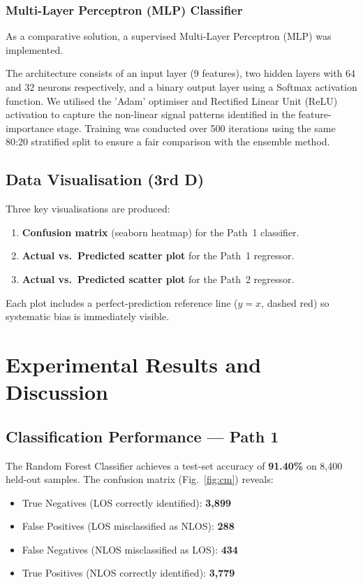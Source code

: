 \documentclass[conference]{IEEEtran}
\begin{document}
\subsubsection{Multi-Layer Perceptron (MLP) Classifier}
As a comparative solution, a supervised Multi-Layer Perceptron (MLP) was implemented. 

The architecture consists of an input layer (9 features), two hidden layers with 64 
and 32 neurons respectively, and a binary output layer using a Softmax activation 
function. We utilised the 'Adam' optimiser and Rectified Linear Unit (ReLU) 
activation to capture the non-linear signal patterns identified in the 
feature-importance stage. Training was conducted over 500 iterations using the 
same 80:20 stratified split to ensure a fair comparison with the ensemble method.

\subsection{Data Visualisation (3rd D)}
Three key visualisations are produced:
\begin{enumerate}
    \item \textbf{Confusion matrix} (seaborn heatmap) for the Path~1 classifier.
    \item \textbf{Actual vs.\ Predicted scatter plot} for the Path~1 regressor.
    \item \textbf{Actual vs.\ Predicted scatter plot} for the Path~2 regressor.
\end{enumerate}
Each plot includes a perfect-prediction reference line ($y = x$, dashed red) so
systematic bias is immediately visible.

\section{Experimental Results and Discussion}

\subsection{Classification Performance --- Path 1}

The Random Forest Classifier achieves a test-set accuracy of \textbf{91.40\%} on
8{,}400 held-out samples. The confusion matrix (Fig.~\ref{fig:cm}) reveals:

\begin{itemize}
    \item True Negatives (LOS correctly identified): \textbf{3{,}899}
    \item False Positives (LOS misclassified as NLOS): \textbf{288}
    \item False Negatives (NLOS misclassified as LOS): \textbf{434}
    \item True Positives (NLOS correctly identified): \textbf{3{,}779}
\end{itemize}
\end{document}
